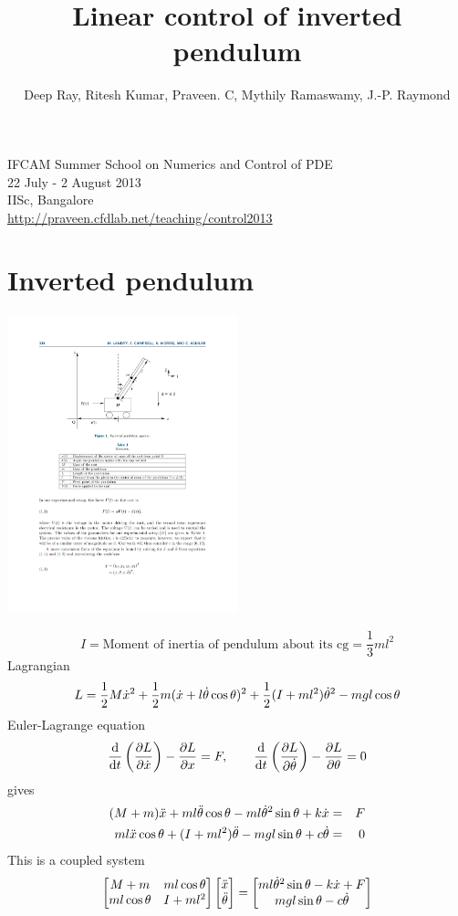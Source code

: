 \documentclass[12pt]{article}
\title{Linear control of inverted pendulum}
\author{Deep Ray, Ritesh Kumar, Praveen. C, Mythily Ramaswamy, J.-P. Raymond}
\date{}
\begin{document}
\maketitle

\begin{center}
IFCAM Summer School on Numerics and Control of PDE\\
22 July - 2 August 2013\\
IISc, Bangalore\\
\url{http://praveen.cfdlab.net/teaching/control2013}
\end{center}


\section{Inverted pendulum}
\begin{center}
\includegraphics[width=0.50\textwidth]{inv_pendulum}
\end{center}
\[
I = \mbox{Moment of inertia of pendulum about its cg} = \frac{1}{3} m l^2
\]
Lagrangian
\[
L = \frac{1}{2} M \dot{x}^2 + \frac{1}{2}m(\dot{x} + l \dot{\theta} \cos\theta)^2 + \frac{1}{2}(I+ml^2)     \dot{\theta}^2 - mgl\cos\theta
\]
Euler-Lagrange equation
\[
\frac{\textrm{d} }{\textrm{d} t} \left(\frac{\partial L}{\partial \dot{x}}\right) - \frac{\partial L}{\partial x} = F, \qquad \frac{\textrm{d} }{\textrm{d} t} \left( \frac{\partial L}{\partial \dot{\theta}}      \right) - \frac{\partial L}{\partial \theta} = 0
\]
gives
\begin{eqnarray*}
(M+m) \ddot{x} + m l \ddot{\theta} \cos\theta - m l \dot{\theta}^2 \sin\theta + k \dot{x} &=&  F \\
m l \ddot{x} \cos\theta + (I+ml^2) \ddot{\theta} - mg l \sin\theta + c \dot{\theta} &=& 0
\end{eqnarray*}
This is a coupled system
\[
\begin{bmatrix}
M+m & m l \cos\theta \\
m l \cos\theta & I + ml^2 \end{bmatrix}
\begin{bmatrix}
\ddot{x} \\ \ddot{\theta} \end{bmatrix} = \begin{bmatrix}
m l \dot{\theta}^2 \sin\theta - k \dot{x} + F \\
mg l \sin\theta - c \dot{\theta} \end{bmatrix}
\]
\end{document}
